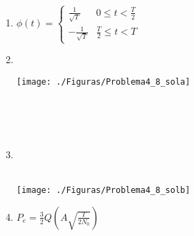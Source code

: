 \documentclass[es,boletin]{uah}
\begin{document}
{

\begin{enumerate}
	\item $\phi(t) = \left \{ \begin{array}{ll} \frac{1}{\sqrt{T}} & 0 \leq t < \frac{T}{2} \\  -\frac{1}{\sqrt{T}} & \frac{T}{2} \leq t < T \end{array} \right.$
	
	\item \ \\
	\begin{figure*}[h!] \centering\texttt{[image: ./Figuras/Problema4\_8\_sola]}	\end{figure*}
	\ \\
	\ \\
	\ \\
	\item \ \\
	\ \\
	\begin{figure*}[h!] 	\centering\texttt{[image: ./Figuras/Problema4\_8\_solb]} 	\end{figure*}
	
	\item $P_e = \frac{3}{2} Q \left ( A \sqrt{\frac{T}{2N_0}} \right ) $
\end{enumerate}

}
\newpage



\newpage
\end{document}
